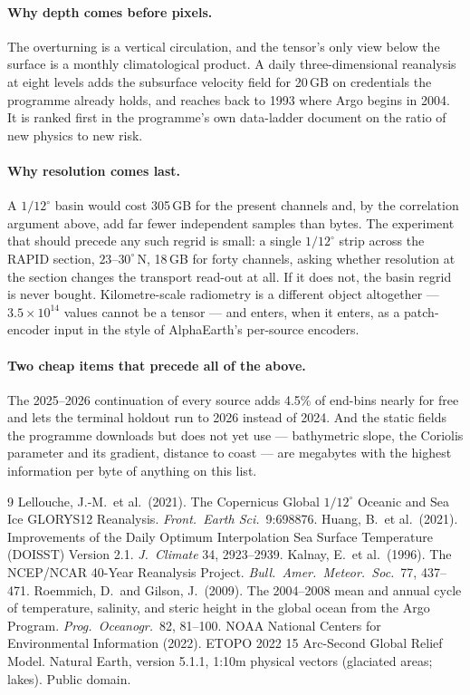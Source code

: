 \documentclass[10pt]{article}
\begin{document}
\paragraph{Why depth comes before pixels.} The overturning is a vertical
circulation, and the tensor's only view below the surface is a monthly
climatological product. A daily three-dimensional reanalysis at eight levels
adds the subsurface velocity field for 20\,GB on credentials the programme
already holds, and reaches back to 1993 where Argo begins in 2004. It is
ranked first in the programme's own data-ladder document on the ratio of new
physics to new risk.

\paragraph{Why resolution comes last.} A $1/12^\circ$ basin would cost
305\,GB for the present channels and, by the correlation argument above, add
far fewer independent samples than bytes. The experiment that should precede
any such regrid is small: a single $1/12^\circ$ strip across the RAPID
section, $23$--$30^\circ$\,N, 18\,GB for forty channels, asking whether
resolution at the section changes the transport read-out at all. If it does
not, the basin regrid is never bought. Kilometre-scale radiometry is a
different object altogether --- $3.5\times10^{14}$ values cannot be a tensor
--- and enters, when it enters, as a patch-encoder input in the style of
AlphaEarth's per-source encoders.

\paragraph{Two cheap items that precede all of the above.} The 2025--2026
continuation of every source adds 4.5\% of end-bins nearly for free and lets
the terminal holdout run to 2026 instead of 2024. And the static fields the
programme downloads but does not yet use --- bathymetric slope, the Coriolis
parameter and its gradient, distance to coast --- are megabytes with the
highest information per byte of anything on this list.

\begin{thebibliography}{9}\small
{} Lellouche, J.-M.\ et al.\ (2021). The Copernicus Global
$1/12^\circ$ Oceanic and Sea Ice GLORYS12 Reanalysis. \emph{Front.\ Earth
Sci.}\ 9:698876.
 Huang, B.\ et al.\ (2021). Improvements of the Daily Optimum
Interpolation Sea Surface Temperature (DOISST) Version 2.1. \emph{J.\
Climate} 34, 2923--2939.
 Kalnay, E.\ et al.\ (1996). The NCEP/NCAR 40-Year Reanalysis
Project. \emph{Bull.\ Amer.\ Meteor.\ Soc.}\ 77, 437--471.
 Roemmich, D.\ and Gilson, J.\ (2009). The 2004--2008 mean and
annual cycle of temperature, salinity, and steric height in the global ocean
from the Argo Program. \emph{Prog.\ Oceanogr.}\ 82, 81--100.
 NOAA National Centers for Environmental Information (2022).
ETOPO 2022 15 Arc-Second Global Relief Model.
 Natural Earth, version 5.1.1, 1:10m physical vectors
(glaciated areas; lakes). Public domain.
\end{thebibliography}
\end{document}
